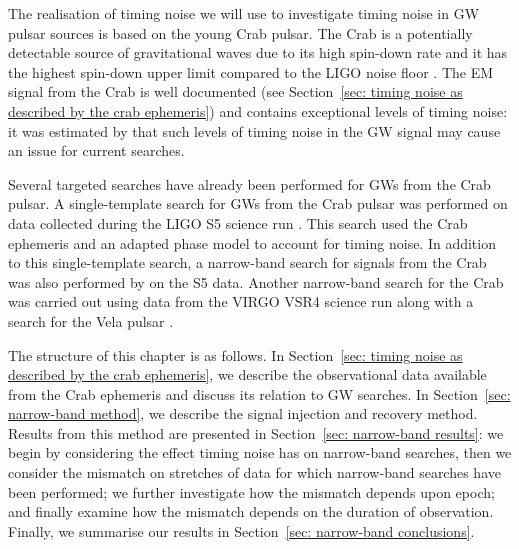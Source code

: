 \documentclass[../full_thesis/full_thesis.tex]{subfiles}
\begin{document}
The realisation of timing noise we will use to investigate timing noise in GW
pulsar sources is based on the young Crab pulsar. The Crab is a potentially
detectable  source of gravitational waves due to its high spin-down rate and it
has the highest spin-down upper limit compared to the LIGO noise floor
\citep{ligo2008}. The EM signal from the Crab is well documented (see
Section~\ref{sec: timing noise as described by the crab ephemeris}) and contains
exceptional levels of timing noise: it was estimated by \citet{Jones2004} that
such levels of timing noise in the GW signal may cause an issue for current
searches.

Several targeted searches have already
been performed for GWs from the Crab pulsar.
A single-template search for GWs from the Crab pulsar was performed on data
collected during the LIGO S5 science run \citep{ligo2008}.  This search used
the Crab ephemeris and an adapted phase model to account for timing noise.  In
addition to this single-template search, a narrow-band search for signals from
the Crab was also performed by \citet{ligo2008} on the S5 data. Another
narrow-band search for the Crab was carried out using data from the VIRGO
VSR4 science run along with a search for the Vela pulsar \citep{ligo2015}.

The structure of this chapter is as follows. In Section~\ref{sec: timing noise
as described by the crab ephemeris}, we describe the observational data
available from the Crab ephemeris and discuss its relation to GW searches. In
Section~\ref{sec: narrow-band method}, we describe the signal injection and
recovery method.  Results from this method are presented in Section~\ref{sec:
narrow-band results}: we begin by considering the effect timing noise has on
narrow-band searches, then we consider the mismatch on stretches of data for
which narrow-band searches have been performed; we further investigate how the
mismatch depends upon epoch; and finally examine how the mismatch depends on
the duration of observation. Finally, we summarise our results in Section~\ref{sec:
narrow-band conclusions}.
\end{document}
